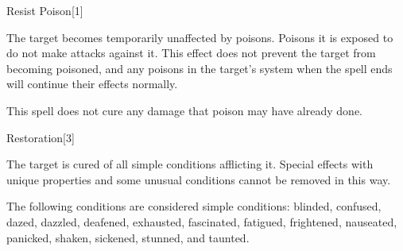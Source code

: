 \begin{spellsection}{Resist Poison}[1]
    \begin{spellheader}
    \end{spellheader}
    \begin{spellcontent}
        \begin{spelltargetinginfo}
        \end{spelltargetinginfo}
        \begin{spelleffects}
            \spelleffect The target becomes temporarily unaffected by poisons. Poisons it is exposed to do not make attacks against it. This effect does not prevent the target from becoming poisoned, and any poisons in the target's system when the spell ends will continue their effects normally.
            \spelldur \durshort
        \end{spelleffects}
    \end{spellcontent}
    \begin{spellfooter}
        \spellnotes This spell does not cure any damage that poison may have already done.
        \miscastrandom
    \end{spellfooter}
    \begin{spellaugments}
    \end{spellaugments}
\end{spellsection}

\begin{spellsection}{Restoration}[3]
    \begin{spellheader}
    \end{spellheader}
    \begin{spellcontent}
        \begin{spelltargetinginfo}
        \end{spelltargetinginfo}
        \begin{spelleffects}
            \spelleffect The target is cured of all simple conditions afflicting it. Special effects with unique properties and some unusual conditions cannot be removed in this way.
        \end{spelleffects}
    \end{spellcontent}
    \begin{spellfooter}
        \spellnotes The following conditions are considered simple conditions: blinded, confused, dazed, dazzled, deafened, exhausted, fascinated, fatigued, frightened, nauseated, panicked, shaken, sickened, stunned, and taunted.
        \miscastexplode
    \end{spellfooter}
\end{spellsection}

